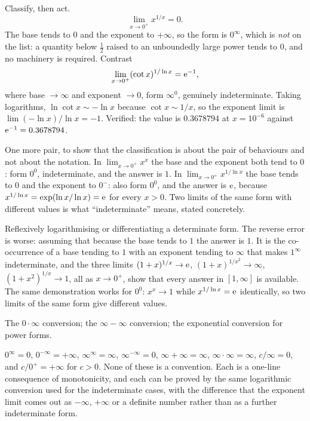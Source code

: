 \begin{worked}
Classify, then act.
\[
\lim_{x\to0^{+}}x^{1/x}=0 .
\]
The base tends to $0$ and the exponent to $+\infty$, so the form is $0^{\infty}$, which is \emph{not} on the list: a quantity below $\tfrac12$ raised to an unboundedly large power tends to $0$, and no machinery is required. Contrast
\[
\lim_{x\to0^{+}}(\cot x)^{1/\ln x}=\mathrm{e}^{-1},
\]
where base $\to\infty$ and exponent $\to0$, form $\infty^{0}$, genuinely indeterminate. Taking logarithms, $\ln\cot x\sim-\ln x$ because $\cot x\sim1/x$, so the exponent limit is $\lim(-\ln x)/\ln x=-1$. Verified: the value is $0.3678794$ at $x=10^{-6}$ against $\mathrm{e}^{-1}=0.3678794$.

One more pair, to show that the classification is about the pair of behaviours and not about the notation. In $\lim_{x\to0^{+}}x^{x}$ the base and the exponent both tend to $0$: form $0^{0}$, indeterminate, and the answer is $1$. In $\lim_{x\to0^{+}}x^{1/\ln x}$ the base tends to $0$ and the exponent to $0^{-}$: also form $0^{0}$, and the answer is $\mathrm{e}$, because $x^{1/\ln x}=\exp(\ln x/\ln x)=\mathrm{e}$ for every $x>0$. Two limits of the same form with different values is what ``indeterminate'' means, stated concretely.
\end{worked}

\begin{trap}
Reflexively logarithmising or differentiating a determinate form. The reverse error is worse: assuming that because the base tends to $1$ the answer is $1$. It is the co-occurrence of a base tending to $1$ with an exponent tending to $\infty$ that makes $1^{\infty}$ indeterminate, and the three limits $(1+x)^{1/x}\to\mathrm{e}$, $(1+x)^{1/x^{2}}\to\infty$, $(1+x^{2})^{1/x}\to1$, all as $x\to0^{+}$, show that every answer in $[1,\infty]$ is available. The same demonstration works for $0^{0}$: $x^{x}\to1$ while $x^{1/\ln x}=\mathrm{e}$ identically, so two limits of the same form give different values.
\end{trap}

\begin{seealsob}The $0\cdot\infty$ conversion; the $\infty-\infty$ conversion; the exponential conversion for power forms.\end{seealsob}

\begin{keynote}
$0^{\infty}=0$, $0^{-\infty}=+\infty$, $\infty^{\infty}=\infty$, $\infty^{-\infty}=0$, $\infty+\infty=\infty$, $\infty\cdot\infty=\infty$, $c/\infty=0$, and $c/0^{+}=+\infty$ for $c>0$. None of these is a convention. Each is a one-line consequence of monotonicity, and each can be proved by the same logarithmic conversion used for the indeterminate cases, with the difference that the exponent limit comes out as $-\infty$, $+\infty$ or a definite number rather than as a further indeterminate form.
\end{keynote}

